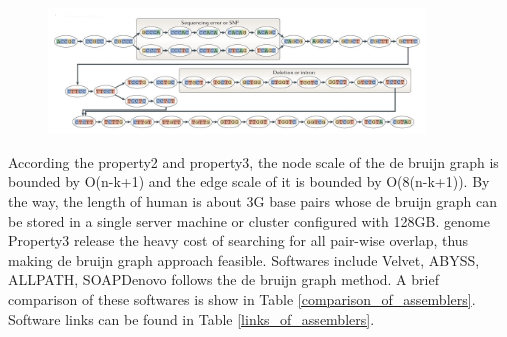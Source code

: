 \documentclass{article}
\begin{document}
\begin{figure}[ht]
  \centering
  \includegraphics[width=10cm]{Figure6.jpg}\\
  \caption{}\label{debruijn_graph_example}
\end{figure}
According the property2 and property3, the node scale of the de bruijn graph is bounded by O(n-k+1) and the edge scale of it is bounded by O(8(n-k+1)). By the way, the length of human is about 3G base pairs whose de bruijn graph can be stored in a single server machine or cluster configured with 128GB. genome Property3 release the heavy cost of searching for all pair-wise overlap, thus making de bruijn graph approach feasible. Softwares include Velvet, ABYSS, ALLPATH, SOAPDenovo follows the de bruijn graph method. A brief comparison of these softwares is show in Table \ref{comparison_of_assemblers}. Software links can be found in Table \ref{links_of_assemblers}.\\
\end{document}
